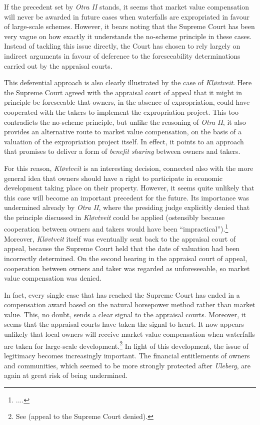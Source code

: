 If the precedent set by {\it Otra II} stands, it seems that market value compensation will never be awarded in future cases when waterfalls are expropriated in favour of large-scale schemes. However, it bears noting that the Supreme Court has been very vague on how exactly it understands the no-scheme principle in these cases. Instead of tackling this issue directly, the Court has chosen to rely largely on indirect arguments in favour of deference to the foreseeability determinations carried out by the appraisal courts. 

This deferential approach is also clearly illustrated by the case of {\it Kløvtveit}. Here the Supreme Court agreed with the appraisal court of appeal that it might in principle be foreseeable that owners, in the absence of expropriation, could have cooperated with the takers to implement the expropriation project. This too contradicts the no-scheme principle, but unlike the reasoning of {\it Otra II}, it also provides an alternative route to market value compensation, on the basis of a valuation of the expropriation project itself. In effect, it points to an approach that promises to deliver a form of {\it benefit sharing} between owners and takers. 

For this reason, {\it Kløvtveit} is an interesting decision, connected also with the more general idea that owners should have a right to participate in economic development taking place on their property.  However, it seems quite unlikely that this case will become an important precedent for the future. Its importance was undermined already by {\it Otra II}, where the presiding judge explicitly denied that the principle discussed in {\it Kløvtveit} could be applied (ostensibly because cooperation between owners and takers would have been ``impractical'').\footnote{....} Moreover, {\it Kløvtveit} itself was eventually sent back to the appraisal court of appeal, because the Supreme Court held that the date of valuation had been incorrectly determined. On the second hearing in the appraisal court of appeal, cooperation between owners and taker was regarded as unforeseeable, so market value compensation was denied.

In fact, every single case that has reached the Supreme Court has ended in a compensation award based on the natural horsepower method rather than market value. This, no doubt, sends a clear signal to the appraisal courts. Moreover, it seems that the appraisal courts have taken the signal to heart. It now appears unlikely that local owners will receive market value compensation when waterfalls are taken for large-scale development.\footnote{See \cite{smibelg15} (appeal to the Supreme Court denied).} In light of this development, the issue of legitimacy becomes increasingly important. The financial entitlements of owners and communities, which seemed to be more strongly protected after {\it Uleberg}, are again at great risk of being undermined. 

